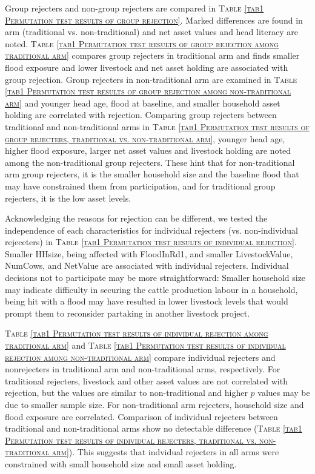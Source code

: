 	Group rejecters and non-group rejecters are compared in \textsc{\normalsize Table \ref{tab1 Permutation test results of group rejection}}. Marked differences are found in arm (\textsf{traditional} vs. non-\textsf{traditional}) and net asset values and head literacy are noted. \textsc{\normalsize Table \ref{tab1 Permutation test results of group rejection among traditional arm}} compares group rejecters in \textsf{traditional} arm and finds smaller flood exposure and lower livestock and net asset holding are associated with group rejection. Group rejecters in non-\textsf{traditional} arm are examined in \textsc{\normalsize Table \ref{tab1 Permutation test results of group rejection among non-traditional arm}} and younger head age, flood at baseline, and smaller household asset holding are correlated with rejection. Comparing group rejecters between \textsf{traditional} and non-\textsf{traditional} arms in \textsc{\normalsize Table \ref{tab1 Permutation test results of group rejecters, traditional vs. non-traditional arm}}, younger head age, higher flood exposure, larger net asset values and livestock holding are noted among the non-\textsf{traditional} group rejecters. These hint that for non-\textsf{traditional} arm group rejecters, it is the smaller household size and the baseline flood that may have constrained them from participation, and for \textsf{traditional} group rejecters, it is the low asset levels.

	Acknowledging the reasons for rejection can be different, we tested the independence of each characteristics for individual rejecters (vs. non-individual rejeceters) in \textsc{\normalsize Table \ref{tab1 Permutation test results of individual rejection}}. Smaller \textsf{HHsize}, being affected with \textsf{FloodInRd1}, and smaller \textsf{LivestockValue}, \textsf{NumCows}, and \textsf{NetValue} are associated with individual rejecters. Individual decisions not to participate may be more straightforward: Smaller household size may indicate difficulty in securing the cattle production labour in a household, being hit with a flood may have resulted in lower livestock levels that would prompt them to reconsider partaking in another livestock project. 

	\textsc{\normalsize Table \ref{tab1 Permutation test results of individual rejection among traditional arm}} and \textsc{\normalsize Table \ref{tab1 Permutation test results of individual rejection among non-traditional arm}} compare individual rejecters and nonrejecters in \textsf{traditional} arm and non-\textsf{traditional} arms, respectively. For \textsf{traditional} rejecters, livestock and other asset values are not correlated with rejection, but the values are similar to non-\textsf{traditional} and higher $p$ values may be due to smaller sample size. For non-\textsf{traditional} arm rejecters, household size and flood exposure are correlated. Comparison of individual rejecters between \textsf{traditional} and non-\textsf{traditional} arms show no detectable difference (\textsc{\normalsize Table \ref{tab1 Permutation test results of individual rejecters, traditional vs. non-traditional arm}}). This suggests that indvidual rejecters in all arms were constrained with small household size and small asset holding.

